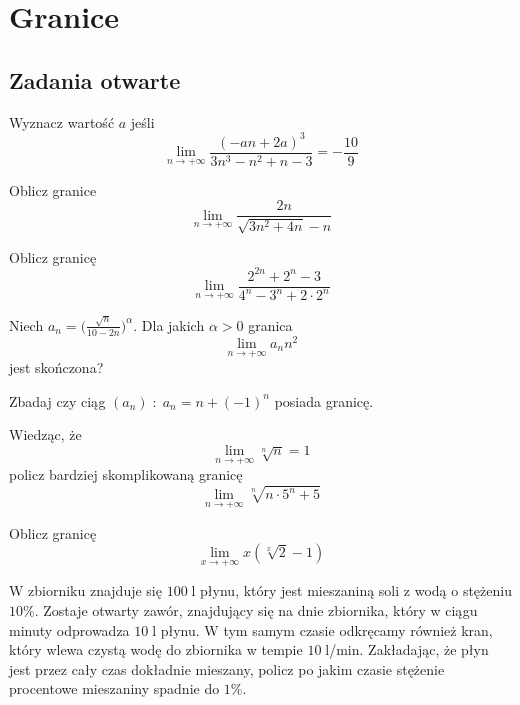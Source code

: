 \setcounter{parc}{0}
\addtocounter{chapc}{1}

\chapter{Granice}

\section{Zadania otwarte}

\zadanie Wyznacz wartość $a$ jeśli \[ \lim_{n \to +\infty} \dfrac{(-an + 2a)^3}{3n^3 - n^2 + n - 3} = - \dfrac{10}{9} \]

\zadanie Oblicz granice \[ \lim_{n \to +\infty} \dfrac{2n}{\sqrt{3n^2 + 4n} - n} \]

\zadanie Oblicz granicę \[ \lim_{n \to +\infty} \dfrac{2^{2n} + 2^n - 3}{4^n - 3^n + 2\cdot 2^n} \]

\zadanie Niech $a_n = \big(\frac{\sqrt{n}}{10 - 2n}\big)^\alpha$. Dla jakich $\alpha > 0$ granica \[ \lim_{n \to +\infty} a_nn^2 \] jest skończona?

\zadanie Zbadaj czy ciąg $(a_n)\; :\; a_n = n + (-1)^n$ posiada granicę.

\zadanie Wiedząc, że \[ \lim_{n \to +\infty} \sqrt[n]{n} = 1 \] policz bardziej skomplikowaną granicę \[ \lim_{n \to +\infty} \sqrt[n]{n \cdot 5^n + 5} \]

\zadanie Oblicz granicę \[ \lim_{x \to +\infty} x(\sqrt[x]{2} - 1) \]

\zadanie W zbiorniku znajduje się $100\;$l płynu, który jest mieszaniną soli z wodą o stężeniu $10\%$. Zostaje otwarty zawór, znajdujący się na dnie zbiornika, który w ciągu minuty odprowadza $10\;$l płynu. W tym samym czasie odkręcamy również kran, który wlewa czystą wodę do zbiornika w tempie {$10\;$l/min.} Zakładając, że płyn jest przez cały czas dokładnie mieszany, policz po jakim czasie stężenie procentowe mieszaniny spadnie do $1\%$. %